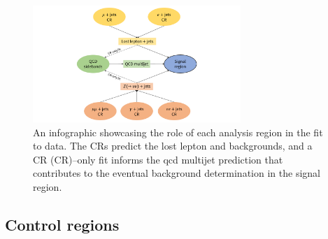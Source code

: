 \begin{figure}[htbp]
    \centering
    \includegraphics[width=0.7\textwidth]{figures/fit_overview.pdf}
    \caption[An infographic showcasing the role of each analysis region in the fit to data]{An infographic showcasing the role of each analysis region in the fit to data. The \glspl{CR} predict the lost lepton and \ztonunu backgrounds, and a \gls{CR} (CR)--only fit informs the \acrshort{qcd} multijet prediction that contributes to the eventual background determination in the signal region.}
    \label{fig:htoinv_fit_overview}
\end{figure}




\subsection{Control regions}
\label{subsec:htoinv_control_regions}

